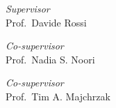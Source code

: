 \documentclass[../thesis.tex]{subfiles}
\begin{document}
    \begin{titlepage}
        \begin{center}
            \begin{Large}
                \textbf{\myUni}\\
            \end{Large}

            \vspace{10pt}

            \begin{large}
                \textsc{\myDepartment}\\
                \textsc{\myFaculty}\\
            \end{large}

            \vspace{10pt}

            \begin{LARGE}
                \begin{center}
                    \textbf{\myTitle}\\
                \end{center}
            \end{LARGE}

            \begin{large}
                \textsl{\myDegree}\\
            \end{large}

            \vspace{100pt}

            \begin{large}
                \begin{flushleft}
                    \textit{Supervisor}\\
                    \vspace{1pt}
                    Prof.\ Davide Rossi
                \end{flushleft}
                \begin{flushleft}
                    \textit{Co-supervisor}\\
                    \vspace{1pt}
                    Prof.\ Nadia S. Noori
                \end{flushleft}
                \begin{flushleft}
                    \textit{Co-supervisor}\\
                    \vspace{1pt}
                    Prof.\ Tim A. Majchrzak
                \end{flushleft}
            

\end{large}
\end{center}
\end{titlepage}
\end{document}

